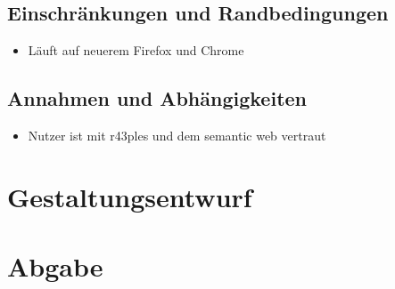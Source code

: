 \documentclass[color, ddc]{tudscrreprt}
\begin{document}
\section{Einschränkungen und Randbedingungen}
\begin{itemize}
\item Läuft auf neuerem Firefox und Chrome
\end{itemize}

\section{Annahmen und Abhängigkeiten}
\begin{itemize}
\item Nutzer ist mit r43ples und dem semantic web vertraut
\end{itemize}

\chapter{Gestaltungsentwurf}

\chapter{Abgabe}



\end{document}
